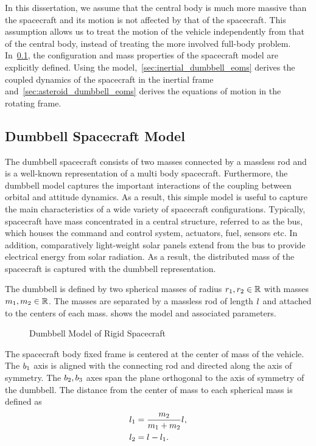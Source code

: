 In this dissertation, we assume that the central body is much more massive than the spacecraft and its motion is not affected by that of the spacecraft.
This assumption allows us to treat the motion of the vehicle independently from that of the central body, instead of treating the more involved full-body problem. 
In~\cref{sec:dumbbell_model}, the configuration and mass properties of the spacecraft model are explicitly defined.
Using the model,~\cref{sec:inertial_dumbbell_eoms} derives the coupled dynamics of the spacecraft in the inertial frame and~\cref{sec:asteroid_dumbbell_eoms} derives the equations of motion in the rotating frame.

\subsection{Dumbbell Spacecraft Model}\label{sec:dumbbell_model}

The dumbbell spacecraft consists of two masses connected by a massless rod and is a well-known representation of a multi body spacecraft.
Furthermore, the dumbbell model captures the important interactions of the coupling between orbital and attitude dynamics. 
As a result, this simple model is useful to capture the main characteristics of a wide variety of spacecraft configurations.
Typically, spacecraft have mass concentrated in a central structure, referred to as the bus, which houses the command and control system, actuators, fuel, sensors etc. 
In addition, comparatively light-weight solar panels extend from the bus to provide electrical energy from solar radiation. 
As a result, the distributed mass of the spacecraft is captured with the dumbbell representation.

The dumbbell is defined by two spherical masses of radius \( r_{1}, r_{2} \in \mathbb{R} \) with masses \( m_{1}, m_{2} \in  \mathbb{R}\).
The masses are separated by a massless rod of length \( l_{} \) and attached to the centers of each mass.
 shows the model and associated parameters.
\begin{figure}[htbp]
    \centering
    
    \caption{Dumbbell Model of Rigid Spacecraft\label{fig:dumbbell_sc}}
\end{figure}
The spacecraft body fixed frame is centered at the center of mass of the vehicle.
The \( b_{1} \)  axis is aligned with the connecting rod and directed along the axis of symmetry.
The \( b_{2}, b_{3} \) axes span the plane orthogonal to the axis of symmetry of the dumbbell.
The distance from the center of mass to each spherical mass is defined as
\begin{align}\label{eq:dumbbell_mass_distances}
    l_{1} &= \frac{m_{2}}{m_{1} + m_{2}} l_{}, \\
    l_{2} &= l_{} - l_{1}.
\end{align}

